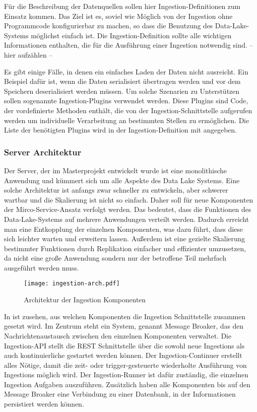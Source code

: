 Für die Beschreibung der Datenquellen sollen hier Ingestion-Definitionen zum Einsatz kommen.
Das Ziel ist es, soviel wie Möglich von der Ingestion ohne Programmcode konfigurierbar zu machen, so dass die Benutzung des Data-Lake-Systems möglichst einfach ist.
Die Ingestion-Definition sollte alle wichtigen Informationen enthalten, die für die Ausführung einer Ingestion notwendig sind.
-- hier aufzählen --

Es gibt einige Fälle, in denen ein einfaches Laden der Daten nicht ausreicht. 
Ein Beispiel dafür ist, wenn die Daten serialisiert übertragen werden und vor dem Speichern deserialisiert werden müssen.
Um solche Szenarien zu Unterstützen sollen sogenannte Ingestion-Plugins verwendet werden.
Diese Plugins sind Code, der vordefinierte Methoden enthält, die von der Ingestion-Schnittstelle aufgerufen werden um individuelle Verarbeitung an bestimmten Stellen zu ermöglichen.
Die Liste der benötigten Plugins wird in der Ingestion-Definition mit angegeben.

\subsubsection{Server Architektur}
Der Server, der im Masterprojekt entwickelt wurde ist eine monolithische Anwendung und kümmert sich um alle Aspekte des Data Lake Systems.
Eine solche Architektur ist anfangs zwar schneller zu entwickeln, aber schwerer wartbar und die Skalierung ist nicht so einfach.
Daher soll für neue Komponenten der Mirco-Service-Ansatz verfolgt werden.
Das bedeutet, dass die Funktionen des Data-Lake-Systems auf mehrere Anwendungen verteilt werden.
Dadurch erreicht man eine Entkopplung der einzelnen Komponenten, was dazu führt, dass diese sich leichter warten und erweitern lassen.
Außerdem ist eine gezielte Skalierung bestimmter Funktionen durch Replikation einfacher und effizienter umzusetzen, da nicht eine große Anwendung sondern nur der betroffene Teil mehrfach ausgeführt werden muss.

\begin{figure}
    \centering
    \texttt{[image: ingestion-arch.pdf]}
    \caption{Architektur der Ingestion Komponenten}
    \label{fig:ingestion_arch}
\end{figure}

In  ist zusehen, aus welchen Komponenten die Ingestion Schnittstelle zusammen gesetzt wird.
Im Zentrum steht ein System, genannt Message Broaker, das den Nachrichtenaustausch zwischen den einzelnen Komponenten verwaltet.
Die Ingestion-API stellt die REST Schnittstelle über die sowohl neue Ingestions als auch kontinuierliche gestartet werden können.
Der Ingestion-Continuer erstellt alles Nötige, damit die zeit- oder trigger-gesteuerte wiederholte Ausführung von Ingestions möglich wird.
Der Ingestion-Runner ist dafür zuständig, die einzelnen Ingestion Aufgaben auszuführen.
Zusätzlich haben alle Komponenten bis auf den Message Broaker eine Verbindung zu einer Datenbank, in der Informationen persistiert werden können.

